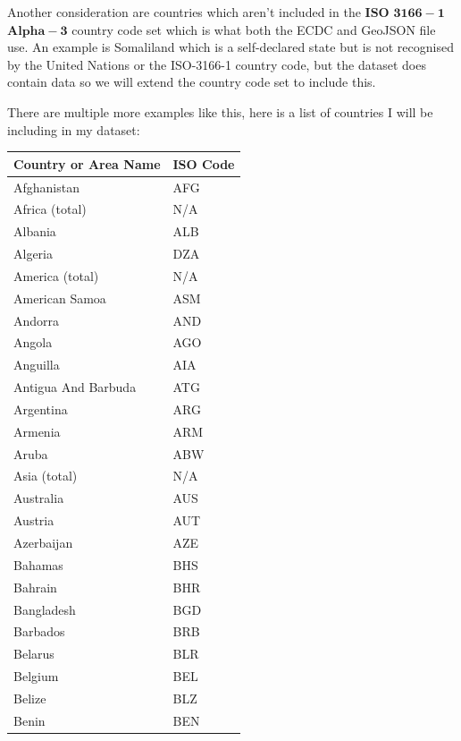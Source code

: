 \documentclass{report}
\begin{document}
Another consideration are countries which aren't included in the $\mathbf{ISO}$ $\mathbf{3166-1}$ $\mathbf{Alpha-3}$ country code set which is what both the ECDC and GeoJSON file use. An example is Somaliland which is a self-declared state but is not recognised by the United Nations or the ISO-3166-1 country code, but the dataset does contain data so we will extend the country code set to include this.

There are multiple more examples like this, here is a list of countries I will be including in my dataset:
\newpage
\begin{center}
    \begin{minipage}{0.46\textwidth}
        \begin{tabular}{|p{10.5em}|p{6em}|}
            \hline
            Country or Area Name & ISO Code\\
            \hline
            Afghanistan & AFG\\
            Africa (total) & N/A\\
            Albania & ALB\\
            Algeria & DZA\\
            America (total) & N/A\\
            American Samoa & ASM\\
            Andorra & AND\\
            Angola & AGO\\
            Anguilla & AIA\\
            Antigua And Barbuda & ATG\\
            Argentina & ARG\\
            Armenia & ARM\\
            Aruba & ABW\\
            Asia (total) & N/A\\
            Australia & AUS\\
            Austria & AUT\\
            Azerbaijan & AZE\\
            Bahamas & BHS\\
            Bahrain & BHR\\
            Bangladesh & BGD\\
            Barbados & BRB\\
            Belarus & BLR\\
            Belgium & BEL\\
            Belize & BLZ\\
            Benin & BEN\\

\end{tabular}
\end{minipage}
\end{center}
\end{document}
